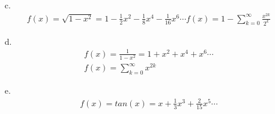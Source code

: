 \documentclass[a4paper]{article}
\begin{document}
\begin{answer}
    \begin{enumerate}
        \item[c.]
            \begin{align*}
                f(x) = \sqrt{1-x^2} = 1- \frac{1}{2} x^2 - \frac{1}{8} x^4 - \frac{1}{16} x^6 \dotsb
                f(x) = 1 - \sum_{k=0}^{\infty} \frac{x^{2k}}{2^k}
            \end{align*}
        \item[d.]
            \begin{align*}
                f(x) = \frac{1}{1-x^2} = 1 + x^2 + x^4 + x^6 \dotsb \\
                f(x) = \sum_{k=0}^{\infty} x^{2k}
            \end{align*}

        \item[e.]
            \begin{align*}
                f(x) = tan(x) = x + \frac{1}{3} x^3 + \frac{2}{15} x^5 \dotsb
            \end{align*}


    \end{enumerate}
\end{answer}
\end{document}
